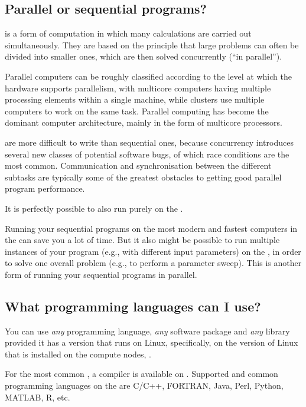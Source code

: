 \subsection{Parallel or sequential programs?}
\label{sec:parallel-or-sequential-programs}

 is a form of computation in which many calculations
are carried out simultaneously. They are based on the principle that large
problems can often be divided into smaller ones, which are then solved
concurrently (``in parallel'').

Parallel computers can be roughly classified according to the level at which
the hardware supports parallelism, with multicore computers having multiple
processing elements within a single machine, while clusters use multiple
computers to work on the same task. Parallel computing has become the dominant
computer architecture, mainly in the form of multicore processors.

 are more difficult to write than sequential ones,
because concurrency introduces several new classes of potential software bugs,
of which race conditions are the most common. Communication and synchronisation
between the different subtasks are typically some of the greatest obstacles to
getting good parallel program performance.

It is perfectly possible to also run purely  on the
\hpc.

Running your sequential programs on the most modern and fastest computers in
the \hpc can save you a lot of time.  But it also might be possible to run
multiple instances of your program (e.g., with different input parameters) on
the \hpc, in order to solve one overall problem (e.g., to perform a parameter
sweep). This is another form of running your sequential programs in parallel.

\subsection{What programming languages can I use?}
\label{sec:what-programming-languages-can-i-use}

You can use \emph{any} programming language, \emph{any} software package and
\emph{any} library provided it has a version that runs on Linux, specifically,
on the version of Linux that is installed on the compute nodes,
\operatingsystembase.

For the most common , a compiler is available on
\operatingsystem. Supported and common programming languages on the \hpc are
C/C++, FORTRAN, Java, Perl, Python, MATLAB, R, etc.


